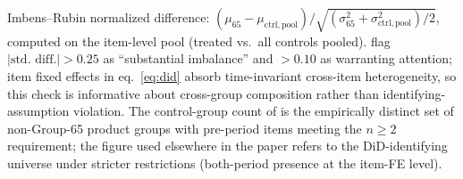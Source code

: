 \begin{table}[!htbp]
\begin{threeparttable}
\begin{tablenotes}
\item[a] Imbens--Rubin normalized difference: $(\mu_{65} - \mu_{\mathrm{ctrl,pool}}) / \sqrt{(\sigma^2_{65} + \sigma^2_{\mathrm{ctrl,pool}})/2}$, computed on the item-level pool (treated vs.\ all \balanceNCtrlGroups{} controls pooled). \citet{imbens2015} flag $|\text{std.\ diff.}| > 0.25$ as ``substantial imbalance'' and $> 0.10$ as warranting attention; item fixed effects in eq.~\eqref{eq:did} absorb time-invariant cross-item heterogeneity, so this check is informative about cross-group composition rather than identifying-assumption violation. The control-group count of \balanceNCtrlGroups{} is the empirically distinct set of non-Group-65 product groups with pre-period items meeting the $n \ge 2$ requirement; the \controlGroupCount{} figure used elsewhere in the paper refers to the DiD-identifying universe under stricter restrictions (both-period presence at the item-FE level).
\end{tablenotes}
\end{threeparttable}
\end{table}
